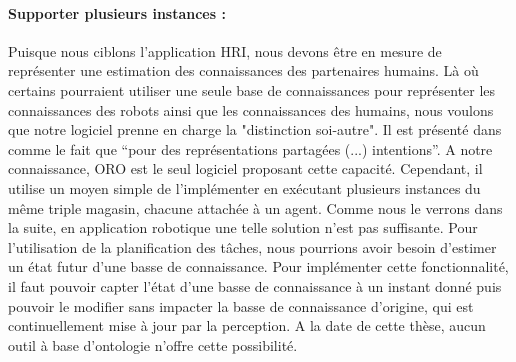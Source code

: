 \paragraph{Supporter plusieurs instances :} Puisque nous ciblons l'application HRI, nous devons être en mesure de représenter une estimation des connaissances des partenaires humains. Là où certains pourraient utiliser une seule base de connaissances pour représenter les connaissances des robots ainsi que les connaissances des humains, nous voulons que notre logiciel prenne en charge la "distinction soi-autre". Il est présenté dans~\cite{pacherie_2012_phenomenology} comme le fait que ``pour des représentations partagées (...) intentions''. A notre connaissance, ORO est le seul logiciel proposant cette capacité. Cependant, il utilise un moyen simple de l'implémenter en exécutant plusieurs instances du même triple magasin, chacune attachée à un agent. Comme nous le verrons dans la suite, en application robotique une telle solution n'est pas suffisante. Pour l'utilisation de la planification des tâches, nous pourrions avoir besoin d'estimer un état futur d'une basse de connaissance. Pour implémenter cette fonctionnalité, il faut pouvoir capter l'état d'une basse de connaissance à un instant donné puis pouvoir le modifier sans impacter la basse de connaissance d'origine, qui est continuellement mise à jour par la perception. A la date de cette thèse, aucun outil à base d'ontologie n'offre cette possibilité.

